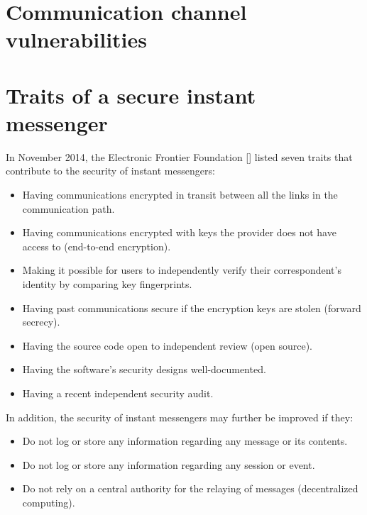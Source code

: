 \section{Communication channel vulnerabilities}\label{sec:communication-channel-vulnerabilities}


\section{Traits of a secure instant messenger}\label{sec:traits-of-a-secure-instant-messenger}
In November 2014, the Electronic Frontier Foundation [\cite{von2010electronic}] listed seven traits that contribute to
the security of instant messengers:
\begin{itemize}
    \item Having communications encrypted in transit between all the links in the communication path.
    \item Having communications encrypted with keys the provider does not have access to (end-to-end encryption).
    \item Making it possible for users to independently verify their correspondent's identity by comparing key fingerprints.
    \item Having past communications secure if the encryption keys are stolen (forward secrecy).
    \item Having the source code open to independent review (open source).
    \item Having the software's security designs well-documented.
    \item Having a recent independent security audit.
\end{itemize}
In addition, the security of instant messengers may further be improved if they:
\begin{itemize}
    \item Do not log or store any information regarding any message or its contents.
    \item Do not log or store any information regarding any session or event.
    \item Do not rely on a central authority for the relaying of messages (decentralized computing).
\end{itemize}


